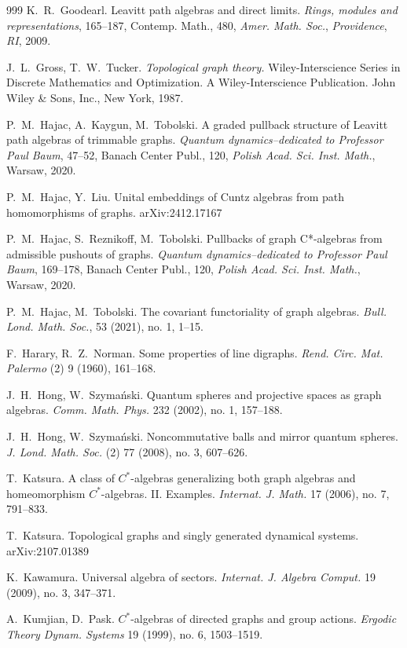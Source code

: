 \documentclass[12pt,times,a4paper]{amsart}
\numberwithin{equation}{section}
\numberwithin{equation}{section}
\begin{document}
\begin{thebibliography}{999}
K.~R.~Goodearl. 
Leavitt path algebras and direct limits. 
{\em Rings, modules and representations}, 165--187, Contemp. Math., 480, 
{\em Amer. Math. Soc.}, {\em Providence}, {\em RI}, 2009.

J.~L.~Gross, T.~W.~Tucker. 
{\em Topological graph theory.} 
Wiley-Interscience Series in Discrete Mathematics and Optimization. 
A Wiley-Interscience Publication. John Wiley \& Sons, Inc., New York, 1987.

P.~M.~Hajac, A.~Kaygun, M.~Tobolski.
A graded pullback structure of Leavitt path algebras of trimmable graphs. 
{\em Quantum dynamics--dedicated to Professor Paul Baum}, 47--52, 
Banach Center Publ., 120, {\em Polish Acad. Sci. Inst. Math.}, Warsaw, 2020.

P.~M.~Hajac, Y.~Liu.
Unital embeddings of Cuntz algebras from path homomorphisms of graphs. arXiv:2412.17167

P.~M.~Hajac, S.~Reznikoff, M.~Tobolski.
Pullbacks of graph C*-algebras from admissible pushouts of graphs.
{\em Quantum dynamics--dedicated to Professor Paul Baum}, 169--178, 
Banach Center Publ., 120, {\em Polish Acad. Sci. Inst. Math.}, Warsaw, 2020.

P.~M.~Hajac, M.~Tobolski.
The covariant functoriality of graph algebras.
{\em Bull. Lond. Math. Soc.}, 53 (2021), no. 1, 1--15.

F.~Harary, R.~Z.~Norman. 
Some properties of line digraphs. 
{\em Rend. Circ. Mat. Palermo} (2) 9 (1960), 161--168.

J.~H.~Hong, W.~Szyma\'nski. 
Quantum spheres and projective spaces as graph algebras. 
{\em Comm. Math. Phys.} 232 (2002), no. 1, 157--188.

J.~H.~Hong, W.~Szyma\'nski. 
Noncommutative balls and mirror quantum spheres. 
{\em J. Lond. Math. Soc.} (2) 77 (2008), no. 3, 607--626.

T.~Katsura. 
A class of $C^*$-algebras generalizing both graph algebras and homeomorphism $C^*$-algebras. II. Examples. 
{\em Internat. J. Math.} 17 (2006), no. 7, 791--833.

T.~Katsura.
Topological graphs and singly generated dynamical systems.
arXiv:2107.01389

K.~Kawamura. 
Universal algebra of sectors. 
{\em Internat. J. Algebra Comput.} 
19 (2009), no. 3, 347--371.

A.~Kumjian, D.~Pask. 
$C^*$-algebras of directed graphs and group actions. 
{\em Ergodic Theory Dynam. Systems} 19 (1999), no. 6, 1503--1519.


\end{thebibliography}
\end{document}
